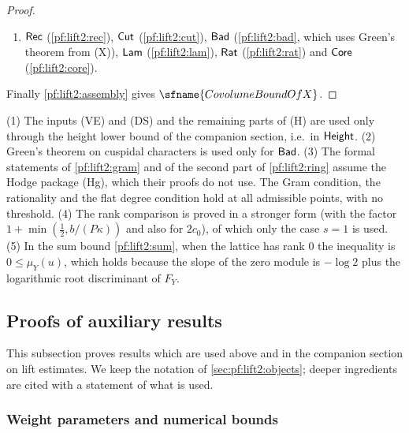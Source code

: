 \begin{proof}
\begin{enumerate}[label=(\arabic*)]
$\lifttwoC{Anchor}$; $\lifttwoC{Ring}$ (\cref{pf:lift2:ring}), $\lifttwoC{Maps}$ (\cref{pf:lift2:maps}),
$\lifttwoC{Rk}$ (\cref{pf:lift2:rank}), $\lifttwoC{Gmin}$ (\cref{pf:lift2:gmin}), $\lifttwoC{Flat}$ (\cref{pf:lift2:flat});
then $\lifttwoC{Low}$ (\cref{pf:lift2:low}).
\item $\mathsf{Rec}$ (\cref{pf:lift2:rec}), $\mathsf{Cut}$ (\cref{pf:lift2:cut}), $\mathsf{Bad}$
(\cref{pf:lift2:bad}, which uses Green's theorem from \textup{(X)}), $\mathsf{Lam}$ (\cref{pf:lift2:lam}), $\mathsf{Rat}$
(\cref{pf:lift2:rat}) and $\mathsf{Core}$ (\cref{pf:lift2:core}).
\end{enumerate}
Finally \cref{pf:lift2:assembly} gives $\sfname{CovolumeBoundOfX}$.
\end{proof}

\begin{remark}\label{pf:lift2:hyprem}
(1) The inputs \textup{(VE)} and \textup{(DS)} and the remaining parts of \textup{(H)} are used only through the height lower bound of the companion
section, i.e.\ in $\mathsf{Height}$. (2) Green's theorem on cuspidal characters is used only for $\mathsf{Bad}$.
(3) The formal statements of \cref{pf:lift2:gram} and of the second part of \cref{pf:lift2:ring} assume the Hodge
package \textup{(Hg)}, which their proofs do not use. The Gram condition, the rationality and the flat degree condition
hold at all admissible points, with no threshold. (4) The rank comparison is
proved in a stronger form (with the factor $1+\min(\frac12,b/(P\kappa))$ and also for $2c_0$), of which only the case
$s=1$ is used. (5) In the sum bound \cref{pf:lift2:sum}, when the lattice has rank $0$ the inequality is
$0\le\mu_Y(u)$, which holds because the slope of the zero module is $-\log2$ plus the logarithmic root discriminant of
$F_Y$.
\end{remark}

\subsection{Proofs of auxiliary results}\label{sec:pf:lift2:aux}

This subsection proves results which are used above and in the companion section on lift estimates. We keep the
notation of \cref{sec:pf:lift2:objects}; deeper ingredients are cited with a statement of what is used.

\subsubsection*{Weight parameters and numerical bounds}

